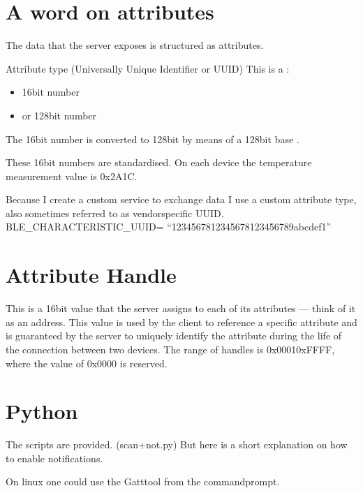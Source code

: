 \documentclass[letterpaper,10pt,english]{sphinxmanual}
\begin{document}
\section{A word on attributes}
\label{\detokenize{notification:a-word-on-attributes}}
The data that the server exposes is structured as attributes.

Attribute type (Universally Unique Identifier or UUID)
This is a :
\begin{itemize}
\item {} 
16\sphinxhyphen{}bit number

\item {} 
or 128\sphinxhyphen{}bit number

\end{itemize}

The 16\sphinxhyphen{}bit number is converted to 128\sphinxhyphen{}bit by means of a
128\sphinxhyphen{}bit base .

These 16\sphinxhyphen{}bit numbers are standardised. On each device the temperature measurement value is 0x2A1C.

Because I create a custom service to exchange data I use a custom attribute type, also sometimes referred to as vendor\sphinxhyphen{}specific UUID.
BLE\_CHARACTERISTIC\_UUID= “12345678\sphinxhyphen{}1234\sphinxhyphen{}5678\sphinxhyphen{}1234\sphinxhyphen{}56789abcdef1”


\section{Attribute Handle}
\label{\detokenize{notification:attribute-handle}}
This is a 16\sphinxhyphen{}bit value that the server assigns to each of its attributes — think of it as an address. This value is used by the client to reference a specific attribute and is guaranteed by the server to uniquely identify the attribute during the life of the connection between two devices. The range of handles is 0x0001\sphinxhyphen{}0xFFFF, where the value of 0x0000 is reserved.


\section{Python}
\label{\detokenize{notification:python}}
The scripts are provided. (scan+not.py)
But here is a short explanation on how to enable notifications.

On linux one could use the Gatttool from the commandprompt.
\end{document}
